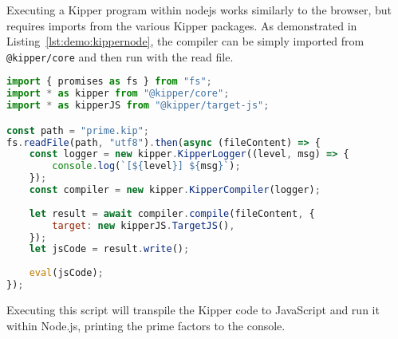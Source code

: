 Executing a Kipper program within \Gls{nodejs} works similarly to the browser, but requires imports from the various Kipper packages. As demonstrated in Listing~\ref{lst:demo:kippernode}, the compiler can be simply imported from \lstinline|@kipper/core| and then run with the read file.

\begin{lstlisting}[language=JavaScript,caption=Executing Kipper code in Node.js, label=lst:demo:kippernode]
import { promises as fs } from "fs";
import * as kipper from "@kipper/core";
import * as kipperJS from "@kipper/target-js";

const path = "prime.kip";
fs.readFile(path, "utf8").then(async (fileContent) => {
	const logger = new kipper.KipperLogger((level, msg) => {
		console.log(`[${level}] ${msg}`);
	});
	const compiler = new kipper.KipperCompiler(logger);
	
	let result = await compiler.compile(fileContent, {
		target: new kipperJS.TargetJS(),
	});
	let jsCode = result.write();
	
	eval(jsCode);
});
\end{lstlisting}

Executing this script will transpile the Kipper code to JavaScript and run it within Node.js, printing the prime factors to the console.
